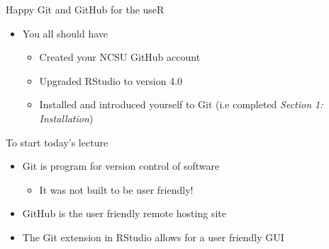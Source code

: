 \documentclass[
  ignorenonframetext,
]{beamer}
\providecommand{\tightlist}{%
  \setlength{\itemsep}{0pt}\setlength{\parskip}{0pt}}
\begin{document}
\begin{frame}{Happy Git and GitHub for the useR}
\protect\hypertarget{happy-git-and-github-for-the-user}{}

\begin{itemize}
\tightlist
\item
  You all should have

  \begin{itemize}
  \tightlist
  \item
    Created your NCSU GitHub account
  \item
    Upgraded RStudio to version 4.0
  \item
    Installed and introduced yourself to Git (i.e completed
    \emph{Section 1: Installation})
  \end{itemize}
\end{itemize}

\end{frame}

\begin{frame}{To start today's lecture}
\protect\hypertarget{to-start-todays-lecture}{}

\begin{itemize}
\item
  Git is program for version control of software

  \begin{itemize}
  \tightlist
  \item
    It was not built to be user friendly!
  \end{itemize}
\item
  GitHub is the user friendly remote hosting site
\item
  The Git extension in RStudio allows for a user friendly GUI
\end{itemize}

\end{frame}
\end{document}
